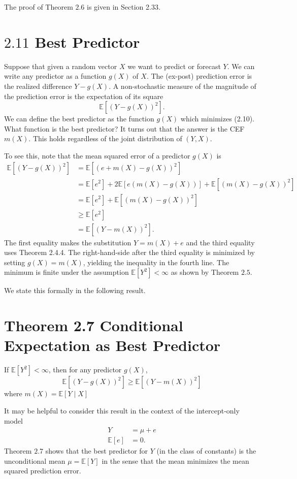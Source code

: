 \documentclass[10pt]{article}
\begin{document}
The proof of Theorem $2.6$ is given in Section 2.33.

\section{$2.11$ Best Predictor}
Suppose that given a random vector $X$ we want to predict or forecast $Y$. We can write any predictor as a function $g(X)$ of $X$. The (ex-post) prediction error is the realized difference $Y-g(X)$. A non-stochastic measure of the magnitude of the prediction error is the expectation of its square
$$
\mathbb{E}\left[(Y-g(X))^{2}\right] .
$$
We can define the best predictor as the function $g(X)$ which minimizes (2.10). What function is the best predictor? It turns out that the answer is the CEF $m(X)$. This holds regardless of the joint distribution of $(Y, X)$.

To see this, note that the mean squared error of a predictor $g(X)$ is
$$
\begin{aligned}
\mathbb{E}\left[(Y-g(X))^{2}\right] &=\mathbb{E}\left[(e+m(X)-g(X))^{2}\right] \\
&=\mathbb{E}\left[e^{2}\right]+2 \mathbb{E}[e(m(X)-g(X))]+\mathbb{E}\left[(m(X)-g(X))^{2}\right] \\
&=\mathbb{E}\left[e^{2}\right]+\mathbb{E}\left[(m(X)-g(X))^{2}\right] \\
& \geq \mathbb{E}\left[e^{2}\right] \\
&=\mathbb{E}\left[(Y-m(X))^{2}\right] .
\end{aligned}
$$
The first equality makes the substitution $Y=m(X)+e$ and the third equality uses Theorem 2.4.4. The right-hand-side after the third equality is minimized by setting $g(X)=m(X)$, yielding the inequality in the fourth line. The minimum is finite under the assumption $\mathbb{E}\left[Y^{2}\right]<\infty$ as shown by Theorem $2.5$.

We state this formally in the following result.

\section{Theorem 2.7 Conditional Expectation as Best Predictor}
If $\mathbb{E}\left[Y^{2}\right]<\infty$, then for any predictor $g(X)$,
$$
\mathbb{E}\left[(Y-g(X))^{2}\right] \geq \mathbb{E}\left[(Y-m(X))^{2}\right]
$$
where $m(X)=\mathbb{E}[Y \mid X]$

It may be helpful to consider this result in the context of the intercept-only model
$$
\begin{aligned}
Y &=\mu+e \\
\mathbb{E}[e] &=0 .
\end{aligned}
$$
Theorem $2.7$ shows that the best predictor for $Y$ (in the class of constants) is the unconditional mean $\mu=\mathbb{E}[Y]$ in the sense that the mean minimizes the mean squared prediction error.
\end{document}
